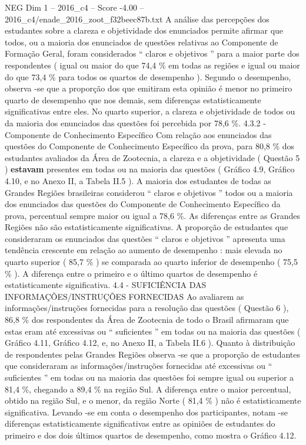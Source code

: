\begin{textsample}{NEG Dim 1 – 2016\_c4 – Score -4.00 – 2016\_c4/enade\_2016\_zoot\_f32beec87b.txt}
A análise das percepções dos estudantes sobre a clareza e objetividade dos enunciados permite afirmar que todos, ou a maioria dos enunciados de questões relativas ao Componente de Formação Geral, foram considerados “ claros e objetivos ” para a maior parte dos respondentes ( igual ou maior do que 74,4 \% em todas as regiões e igual ou maior do que 73,4 \% para todos os quartos de desempenho ).
Segundo o desempenho, observa -se que a proporção dos que emitiram esta opinião é menor no primeiro quarto de desempenho que nos demais, sem diferenças estatisticamente significativas entre eles.
No quarto superior, a clareza e objetividade de todos ou da maioria dos enunciados das questões foi percebida por 78,6 \%. 4.3.2 - Componente de Conhecimento Específico Com relação aos enunciados das questões do Componente de Conhecimento Específico da prova, para 80,8 \% dos estudantes avaliados da Área de Zootecnia, a clareza e a objetividade ( Questão 5 ) \textbf{estavam} presentes em todas ou na maioria das questões ( Gráfico 4.9, Gráfico 4.10, e no Anexo II, a Tabela II.5 ).
A maioria dos estudantes de todas as Grandes Regiões brasileiras considerou “ claros e objetivos ” todos ou a maioria dos enunciados das questões do Componente de Conhecimento Específico da prova, percentual sempre maior ou igual a 78,6 \%.
As diferenças entre as Grandes Regiões não são estatisticamente significativas.
A proporção de estudantes que consideraram os enunciados das questões “ claros e objetivos ” apresenta uma tendência crescente em relação ao aumento de desempenho : mais elevada no quarto superior ( 85,7 \% ) se comparada ao quarto inferior de desempenho ( 75,5 \% ).
A diferença entre o primeiro e o último quartos de desempenho é estatisticamente significativa. 4.4 - SUFICIÊNCIA DAS INFORMAÇÕES/INSTRUÇÕES FORNECIDAS Ao avaliarem as informações/instruções fornecidas para a resolução das questões ( Questão 6 ), 86,8 \% dos respondentes da Área de Zootecnia de todo o Brasil afirmaram que estas eram até excessivas ou “ suficientes ” em todas ou na maioria das questões ( Gráfico 4.11, Gráfico 4.12, e, no Anexo II, a Tabela II.6 ).
Quanto à distribuição de respondentes pelas Grandes Regiões observa -se que a proporção de estudantes que consideraram as informações/instruções fornecidas até excessivas ou “ suficientes ” em todas ou na maioria das questões foi sempre igual ou superior a 81,4 \%, chegando a 89,4 \% na região Sul.
A diferença entre o maior percentual, obtido na região Sul, e o menor, da região Norte ( 81,4 \% ) não é estatisticamente significativa.
Levando -se em conta o desempenho dos participantes, notam -se diferenças estatisticamente significativas entre as opiniões de estudantes do primeiro e dos dois últimos quartos de desempenho, como mostra o Gráfico 4.12.

\end{textsample}

